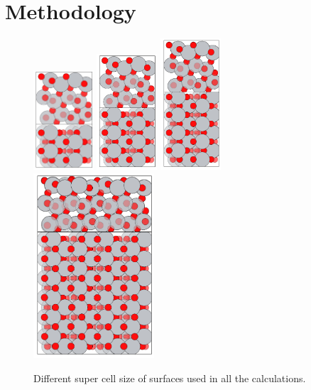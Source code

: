 \documentclass[aip,amsmath,amssymb,reprint, jcp]{revtex4-1}
\begin{document}
\section{Methodology}
\begin{figure}
\centering
\includegraphics[width=0.2\textwidth]{TiO2_101sur_2by1supercell.png}
\includegraphics[width=0.2\textwidth]{TiO2_101sur_3by1supercell.png}
\includegraphics[width=0.2\textwidth]{TiO2_101sur_4by1supercell.png}
\includegraphics[width=0.4\textwidth]{TiO2_101sur_6by2supercell.png}
\caption{Different super cell size of surfaces used in all the calculations.}
\label{fig:exptobser}
\end{figure}
\end{document}
